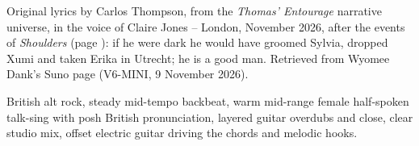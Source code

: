 
\label{sec:you-re-a-good-man-thomas}
\begin{notes}
Original lyrics by Carlos Thompson, from the \emph{Thomas' Entourage} narrative universe, in the voice of Claire Jones -- London, November 2026, after the events of \emph{Shoulders} (page \pageref{sec:shoulders}): if he were dark he would have groomed Sylvia, dropped Xumi and taken Erika in Utrecht; he is a good man. Retrieved from Wyomee Dank's Suno page (V6-MINI, 9 November 2026).
\end{notes}
\begin{style}
British alt rock, steady mid-tempo backbeat, warm mid-range female half-spoken talk-sing with posh British pronunciation, layered guitar overdubs and close, clear studio mix, offset electric guitar driving the chords and melodic hooks.
\end{style}
